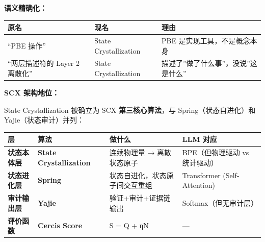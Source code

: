 \documentclass[
  12pt,
]{ctexart}
\begin{document}
\textbf{语义精确化：}

\begin{longtable}[]{@{}
  >{\raggedright\arraybackslash}p{}
  >{\raggedright\arraybackslash}p{}
  >{\raggedright\arraybackslash}p{}@{}}
\toprule\noalign{}
\begin{minipage}[b]{\linewidth}\raggedright
原名
\end{minipage} & \begin{minipage}[b]{\linewidth}\raggedright
现名
\end{minipage} & \begin{minipage}[b]{\linewidth}\raggedright
理由
\end{minipage} \\
\midrule\noalign{}
\endhead
\bottomrule\noalign{}
\endlastfoot
``PBE 操作'' & State Crystallization & PBE 是实现工具，不是概念本身 \\
``两层描述符的 Layer 2 离散化'' & State Crystallization &
描述了''做了什么事''，没说''这是什么'' \\
\end{longtable}

\textbf{SCX 架构地位：}

State Crystallization 被确立为 SCX \textbf{第三核心算法}，与
Spring（状态自进化）和 Yajie（状态审计）并列：

\begin{longtable}[]{@{}
  >{\raggedright\arraybackslash}p{}
  >{\raggedright\arraybackslash}p{}
  >{\raggedright\arraybackslash}p{}
  >{\raggedright\arraybackslash}p{}@{}}
\toprule\noalign{}
\begin{minipage}[b]{\linewidth}\raggedright
层
\end{minipage} & \begin{minipage}[b]{\linewidth}\raggedright
算法
\end{minipage} & \begin{minipage}[b]{\linewidth}\raggedright
做什么
\end{minipage} & \begin{minipage}[b]{\linewidth}\raggedright
LLM 对应
\end{minipage} \\
\midrule\noalign{}
\endhead
\bottomrule\noalign{}
\endlastfoot
\textbf{状态本体层} & \textbf{State Crystallization} & 连续物理量 →
离散状态原子 & BPE（但物理驱动 vs 统计驱动） \\
\textbf{状态进化层} & \textbf{Spring} & 状态自进化，状态原子间交互重组 &
Transformer (Self-Attention) \\
\textbf{审计输出层} & \textbf{Yajie} & 验证+审计+证据链输出 &
Softmax（但无审计层） \\
\textbf{评价函数} & \textbf{Cercis Score} & S = Q + ηN & --- \\
\end{longtable}
\end{document}
